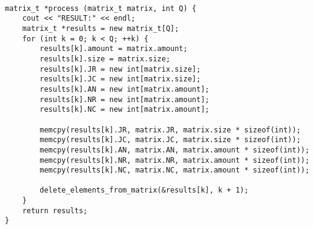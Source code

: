 \begin{center}
\captionsetup{justification=raggedright,singlelinecheck=off}
\begin{lstlisting}[label=lst:single,caption=Однопоточная реализация алгоритма обработки упакованной разреженной матрицы]

matrix_t *process (matrix_t matrix, int Q) {
	cout << "RESULT:" << endl;
	matrix_t *results = new matrix_t[Q];
	for (int k = 0; k < Q; ++k) {
		results[k].amount = matrix.amount;
		results[k].size = matrix.size;
		results[k].JR = new int[matrix.size];
		results[k].JC = new int[matrix.size];
		results[k].AN = new int[matrix.amount];
		results[k].NR = new int[matrix.amount];
		results[k].NC = new int[matrix.amount];
		
		memcpy(results[k].JR, matrix.JR, matrix.size * sizeof(int));
		memcpy(results[k].JC, matrix.JC, matrix.size * sizeof(int));
		memcpy(results[k].AN, matrix.AN, matrix.amount * sizeof(int));
		memcpy(results[k].NR, matrix.NR, matrix.amount * sizeof(int));
		memcpy(results[k].NC, matrix.NC, matrix.amount * sizeof(int));
		
		delete_elements_from_matrix(&results[k], k + 1);
	}
	return results;
}

\end{lstlisting} 
\end{center}

